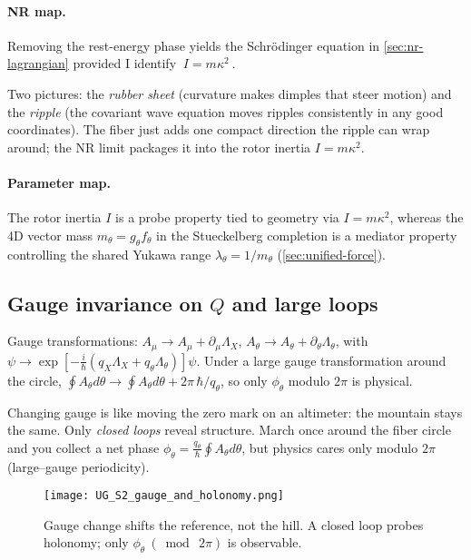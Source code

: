 \paragraph{NR map.} Removing the rest-energy phase yields the Schr\"odinger equation in \cref{sec:nr-lagrangian} provided I identify $\boxed{\ I=m\kappa^2\ }$.

\begin{idea}
Two pictures: the \emph{rubber sheet} (curvature makes dimples that steer motion) and the \emph{ripple} (the covariant wave equation moves ripples consistently in any good coordinates). The fiber just adds one compact direction the ripple can wrap around; the NR limit packages it into the rotor inertia $I=m\kappa^2$.
\end{idea}

\paragraph{Parameter map.} The rotor inertia $I$ is a probe property tied to geometry via $I=m\kappa^2$, whereas the 4D vector mass $m_\theta=g_\theta f_\theta$ in the Stueckelberg completion is a mediator property controlling the shared Yukawa range $\lambda_\theta=1/m_\theta$ (\cref{sec:unified-force}).

\subsection{Gauge invariance on \texorpdfstring{$Q$}{Q} and large loops}\label{sec:gauge-invariance}
Gauge transformations: $A_\mu\to A_\mu+\partial_\mu\Lambda_X$, $A_\theta\to A_\theta+\partial_\theta\Lambda_\theta$, with $\psi\to \exp\!\left[-\tfrac{i}{\hbar}(q_X\Lambda_X+q_\theta\Lambda_\theta)\right]\psi$. Under a large gauge transformation around the circle, $\oint A_\theta d\theta \to \oint A_\theta d\theta + 2\pi\,\hbar/q_\theta$, so only $\phi_\theta$ modulo $2\pi$ is physical.

\begin{idea}
Changing gauge is like moving the zero mark on an altimeter: the mountain stays the same. Only \emph{closed loops} reveal structure. March once around the fiber circle and you collect a net phase $\phi_\theta=\tfrac{q_\theta}{\hbar}\oint A_\theta d\theta$, but physics cares only modulo $2\pi$ (large–gauge periodicity).
\end{idea}

\begin{figure}[h]
  \centering
  \texttt{[image: UG\_S2\_gauge\_and\_holonomy.png]}
  \caption{Gauge change shifts the reference, not the hill. A closed loop probes holonomy; only $\phi_\theta\ (\bmod\ 2\pi)$ is observable.}
\end{figure}

